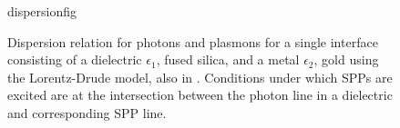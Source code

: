 \begin{figure}[ht]
 \centering
{dispersionfig}
\caption{ Dispersion relation for photons and plasmons for a single
interface consisting of a dielectric $\epsilon_1$, fused silica, and a
metal $\epsilon_2$, gold using the Lorentz-Drude model, also in
. Conditions under which SPPs are excited are at the
intersection between the photon line in a dielectric and corresponding SPP line.  }
\label{fig:dispersionrelation}
\end{figure}

